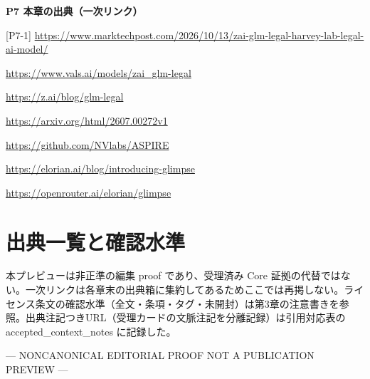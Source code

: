\documentclass[lualatex,a4paper,10pt]{jlreq}
\begin{document}
\begin{tcolorbox}[colback=white,colframe=SurveyRule,arc=1mm,boxrule=0.4pt,left=2mm,right=2mm]
\textbf{P7 本章の出典（一次リンク）}\par\footnotesize
[P7-1] \url{https://www.marktechpost.com/2026/10/13/zai-glm-legal-harvey-lab-legal-ai-model/}\par
[P7-2] \url{https://www.vals.ai/models/zai_glm-legal}\par
[P7-3] \url{https://z.ai/blog/glm-legal}\par
[P7-4] \url{https://arxiv.org/html/2607.00272v1}\par
[P7-5] \url{https://github.com/NVlabs/ASPIRE}\par
[P7-6] \url{https://elorian.ai/blog/introducing-glimpse}\par
[P7-7] \url{https://openrouter.ai/elorian/glimpse}\par
\end{tcolorbox}

\onecolumn
\section*{出典一覧と確認水準}
本プレビューは非正準の編集 proof であり、受理済み Core 証拠の代替ではない。一次リンクは各章末の出典箱に集約してあるためここでは再掲しない。ライセンス条文の確認水準（全文・条項・タグ・未開封）は第3章の注意書きを参照。出典注記つきURL（受理カードの文脈注記を分離記録）は引用対応表の accepted\_context\_notes に記録した。

\begin{center}\color{SurveyMuted}--- NONCANONICAL EDITORIAL PROOF \quad NOT A PUBLICATION PREVIEW ---\end{center}
\end{document}
